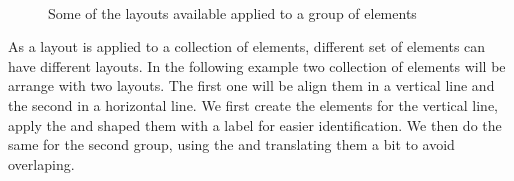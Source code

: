 \documentclass[a4paper,10pt,twoside]{book}
\begin{document}
\begin{figure}[h]
        \centering
		 \hfill
		\hfill
		 \\ 
		 \hfill
		\hfill
        \caption{Some of the layouts available applied to a group of elements}\label{fig:roLayouts}
\end{figure}

As a layout is applied to a collection of elements, different set of elements can have different layouts. In the following example two collection of elements will be arrange with two layouts. The first one will be align them in a vertical line and the second in a horizontal line. 
We first create the elements for the vertical line, apply the  and shaped them with a label for easier identification. We then do the same for the second group, using the  and translating them a bit to avoid overlaping.
\end{document}
